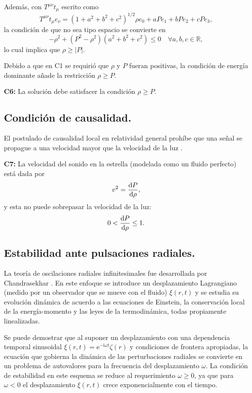 Además, con $T^{\mu \nu} t_{\mu}$ escrito como
\begin{equation}
T^{\mu \nu} t_{\mu}e_{\nu}=\left(1+a^{2}+b^{2}+c^{2}\right)^{1 / 2} \rho e_{0}+a P e_{1}+b P e_{2}+c P e_{3},
\end{equation}
la condición de que no sea tipo espacio se convierte en
\begin{equation}
    -\rho^2 + (P^2-\rho^2)(a^2+b^2+c^2) \leq 0 \quad \forall a,b,c \in \mathbb{R},
\end{equation}
lo cual implica que $\rho \geq |P|$.

Debido a que en C1 se requirió que $\rho$ y $P$ fueran positivas, la condición de energía dominante añade la restricción $\rho \geq P$.

\textbf{C6:} La solución debe satisfacer la condición $\rho \geq P$.

\subsection*{Condición de causalidad.}
\noindent El postulado de causalidad local en relatividad general prohíbe que una señal se propague a una velocidad mayor que la velocidad de la luz \cite{Hawking1973}. 

\textbf{C7:}  La velocidad del sonido en la estrella (modelada como un fluido perfecto) está dada por 
\begin{equation}
    v^2=\dv{P}{\rho},
\end{equation}
y esta no puede sobrepasar la velocidad de la luz:
\begin{equation}
    0 < \dv{P}{\rho} \leq 1 .
\end{equation}

\subsection*{Estabilidad ante pulsaciones radiales.}

\noindent La teoría de oscilaciones radiales infinitesimales fue desarrollada por Chandrasekhar \cite{Chandrasekhar1964a}. En este enfoque se introduce un desplazamiento Lagrangiano (medido por un observador que se mueve con el fluido) $\xi(r,t)$ y se estudia su evolución dinámica de acuerdo a las ecuaciones de Einstein, la conservación local de la energía-momento y las leyes de la termodinámica, todas propiamente linealizadas.

Se puede demostrar \cite{Chandrasekhar1964a,Misner1973} que al suponer un desplazamiento con una dependencia temporal sinusoidal $\xi(r, t)=\mathrm{e}^{-\mathrm{i} \omega t} \zeta(r)$  y condiciones de frontera apropiadas, la ecuación que gobierna la dinámica de las perturbaciones radiales se convierte en un problema de autovalores para la frecuencia del desplazamiento $\omega$. La condición de estabilidad en este esquema se reduce al requerimiento $\omega \geq 0$, ya que para $\omega<0$ el desplazamiento $\xi(r,t)$ crece exponencialmente con el tiempo.   

